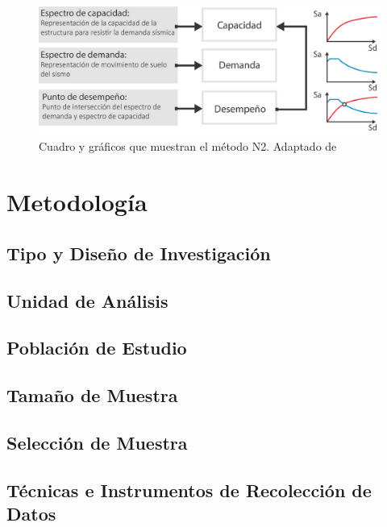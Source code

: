 \documentclass[doc, 12pt, a4paper, draftall]{apa7} %
\begin{document}
\begin{figure}[!ht]
	\centering
  \includegraphics[scale=0.36]{E_IMAGENES/3_Capitulo3/Cap3_Imagen70.png}
	\caption{\centering\footnotesize Cuadro y gráficos que muestran el método N2. Adaptado de \cite{deWaal2009}}
	\label{Cap3_Figura3}
\end{figure}

\lipsum[19]

\section{Metodología}

\subsection{Tipo y Diseño de Investigación}

\subsection{Unidad de Análisis}

\subsection{Población de Estudio}

\subsection{Tamaño de Muestra}

\subsection{Selección de Muestra}

\subsection{Técnicas e Instrumentos de Recolección de Datos}
\end{document}

